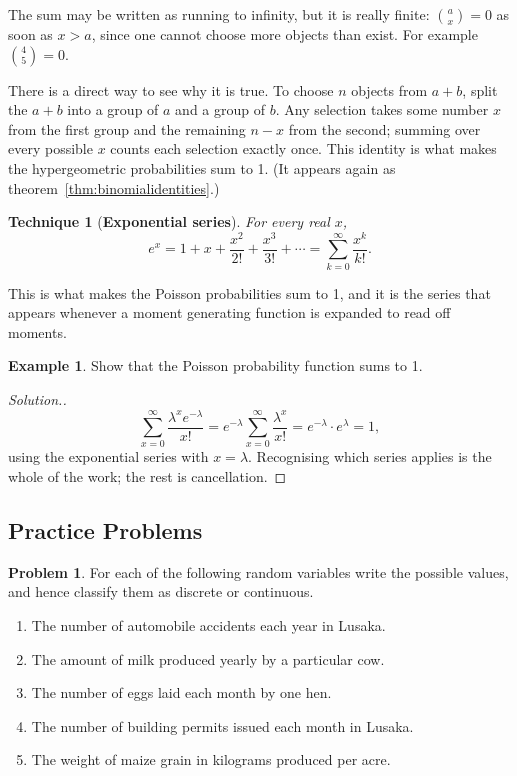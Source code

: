 \documentclass[12pt,a4paper]{report}
\theoremstyle{definition}
\newtheorem{example}[thm]{Example}
\theoremstyle{plain}
\newtheorem{tech}{Technique}[section]
\theoremstyle{definition}
\newtheorem{problemx}{Problem}[section]
\newenvironment{problem}{\begin{problemx}}{\end{problemx}}
\newenvironment{solution}
  {\renewcommand{\qedsymbol}{}\begin{proof}[\textit{Solution}.]}
  {\end{proof}}
\begin{document}
The sum may be written as running to infinity, but it is really finite: $\binom{a}{x} = 0$
as soon as $x>a$, since one cannot choose more objects than exist. For example
$\binom{4}{5} = 0$.

There is a direct way to see why it is true. To choose $n$ objects from $a+b$, split the
$a+b$ into a group of $a$ and a group of $b$. Any selection takes some number $x$ from the
first group and the remaining $n-x$ from the second; summing over every possible $x$ counts
each selection exactly once. This identity is what makes the hypergeometric probabilities
sum to 1. (It appears again as theorem~\ref{thm:binomialidentities}.)

\begin{tech}[\textbf{Exponential series}]
For every real $x$,
\[e^{x} = 1+x+\frac{x^{2}}{2!}+\frac{x^{3}}{3!}+\cdots = \sum_{k=0}^{\infty}\frac{x^{k}}{k!}.\]
\end{tech}

This is what makes the Poisson probabilities sum to 1, and it is the series that appears
whenever a moment generating function is expanded to read off moments.

\begin{example}
Show that the Poisson probability function sums to 1.
\end{example}

\begin{solution}
\[\sum_{x=0}^{\infty}\frac{\lambda^{x}e^{-\lambda}}{x!}
 = e^{-\lambda}\sum_{x=0}^{\infty}\frac{\lambda^{x}}{x!}
 = e^{-\lambda}\cdot e^{\lambda} = 1,\]
using the exponential series with $x = \lambda$. Recognising which series applies is the
whole of the work; the rest is cancellation.
\end{solution}

\subsection{Practice Problems}

\begin{problem}
For each of the following random variables write the possible values, and hence classify
them as discrete or continuous.
\begin{enumerate}
\item[(a).] The number of automobile accidents each year in Lusaka.
\item[(b).] The amount of milk produced yearly by a particular cow.
\item[(c).] The number of eggs laid each month by one hen.
\item[(d).] The number of building permits issued each month in Lusaka.
\item[(e).] The weight of maize grain in kilograms produced per acre.
\end{enumerate}
\end{problem}
\end{document}
